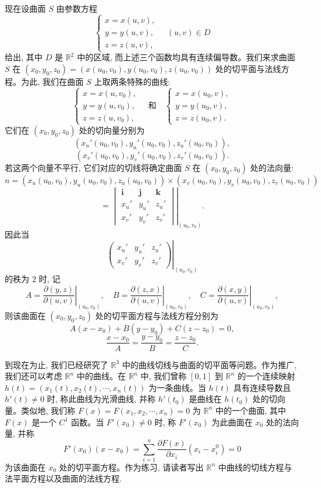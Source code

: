 现在设曲面 $S$ 由参数方程
\[
  \begin{cases}
    x=x(u,v),\\
    y=y(u,v),\\
    z=z(u,v),
  \end{cases}
  \quad (u,v)\in D
\]
给出, 其中 $D$ 是 $\mathbb R^2$ 中的区域, 而上述三个函数均具有连续偏导数。我们来求曲面 $S$ 在 $(x_0,y_0,z_0)=(x(u_0,v_0),y(u_0,v_0),z(u_0,v_0))$ 处的切平面与法线方程。为此, 我们在曲面 $S$ 上取两条特殊的曲线:
\[
  \begin{cases}
    x=x(u,v_0),\\
    y=y(u,v_0),\\
    z=z(u,v_0),
  \end{cases}
  \quad\text{和}\quad
  \begin{cases}
    x=x(u_0,v),\\
    y=y(u_0,v),\\
    z=z(u_0,v).
  \end{cases}
\]
它们在 $(x_0,y_0,z_0)$ 处的切向量分别为
\[
  (x_u'(u_0,v_0),y_u'(u_0,v_0),z_u'(u_0,v_0)),
\]
\[
  (x_v'(u_0,v_0),y_v'(u_0,v_0),z_v'(u_0,v_0)).
\]
若这两个向量不平行, 它们对应的切线将确定曲面 $S$ 在 $(x_0,y_0,z_0)$ 处的法向量:
\[
  n=(x_u(u_0,v_0),y_u(u_0,v_0),z_u(u_0,v_0))
  \times(x_v(u_0,v_0),y_v(u_0,v_0),z_v(u_0,v_0))
\]
\[
  =
  \left.
  \begin{vmatrix}
    \mathbf i & \mathbf j & \mathbf k\\
    x_u' & y_u' & z_u'\\
    x_v' & y_v' & z_v'
  \end{vmatrix}
  \right|_{(u_0,v_0)}.
\]
因此当
\[
  \left.
  \begin{pmatrix}
    x_u' & y_u' & z_u'\\
    x_v' & y_v' & z_v'
  \end{pmatrix}
  \right|_{(u_0,v_0)}
\]
的秩为 $2$ 时, 记
\[
  A=\left.\frac{\partial(y,z)}{\partial(u,v)}\right|_{(u_0,v_0)},\quad
  B=\left.\frac{\partial(z,x)}{\partial(u,v)}\right|_{(u_0,v_0)},\quad
  C=\left.\frac{\partial(x,y)}{\partial(u,v)}\right|_{(u_0,v_0)},
\]
则该曲面在 $(x_0,y_0,z_0)$ 处的切平面方程与法线方程分别为
\[
  A(x-x_0)+B(y-y_0)+C(z-z_0)=0,
\]
\[
  \frac{x-x_0}{A}=\frac{y-y_0}{B}=\frac{z-z_0}{C}.
\]

到现在为止, 我们已经研究了 $\mathbb R^3$ 中的曲线切线与曲面的切平面等问题。作为推广, 我们还可以考虑 $\mathbb R^n$ 中的曲线。在 $\mathbb R^n$ 中, 我们曾称 $[0,1]$ 到 $\mathbb R^n$ 的一个连续映射 $h(t)=(x_1(t),x_2(t),\cdots,x_n(t))$ 为一条曲线。当 $h(t)$ 具有连续导数且 $h'(t)\ne0$ 时, 称此曲线为光滑曲线, 并称 $h'(t_0)$ 是曲线在 $h(t_0)$ 处的切向量。类似地, 我们称 $F(x)=F(x_1,x_2,\cdots,x_n)=0$ 为 $\mathbb R^n$ 中的一个曲面, 其中 $F(x)$ 是一个 $C^1$ 函数。当 $F'(x_0)\ne0$ 时, 称 $F'(x_0)$ 为此曲面在 $x_0$ 处的法向量, 并称
\[
  F'(x_0)(x-x_0)
  =
  \sum_{i=1}^n \frac{\partial F(x)}{\partial x_i}(x_i-x_i^0)=0
\]
为该曲面在 $x_0$ 处的切平面方程。作为练习, 请读者写出 $\mathbb R^n$ 中曲线的切线方程与法平面方程以及曲面的法线方程.

